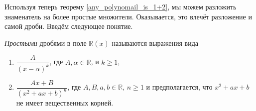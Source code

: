 Используя теперь теорему \ref{any_polynomail_is_1+2}, мы можем разложить знаменатель на более простые множители. Оказывается, это влечёт разложение и самой дроби. Введём следующее понятие.

\begin{definition}
    \textit{Простыми} дробями в поле $\mathbb{R}(x)$ называются выражения вида
    \begin{enumerate}
        \item $\dfrac{A}{(x-\alpha)^k}$, где $A,\alpha \in \mathbb{R}$, и $k\ge 1$,
        \item $\dfrac{Ax + B}{(x^2 + ax + b)^n}$, где $A,B, a,b \in \mathbb{R}$, $n\ge 1$ и предполагается, что $x^2 + ax +b$ не имеет вещественных корней.
    \end{enumerate}
    \end{definition}


